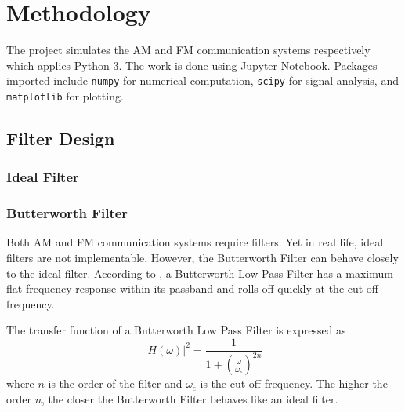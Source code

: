 \documentclass[../ECE459FinalProjectReport.tex]{subfiles}
\begin{document}
\chapter{Methodology}
The project simulates the AM and FM communication systems respectively which applies Python 3. The work is done using Jupyter Notebook. Packages imported include \verb|numpy| for numerical computation, \verb|scipy| for signal analysis, and \verb|matplotlib| for plotting.

\section{Filter Design}

\subsection{Ideal Filter}

\subsection{Butterworth Filter}

Both AM and FM communication systems require filters. Yet in real life, ideal filters are not implementable. However, the Butterworth Filter can behave closely to the ideal filter. According to \cite{storrButterworthFilterDesign2013,kudekiAnalogSignalsSystems2009}, a Butterworth Low Pass Filter has a maximum flat frequency response within its passband and rolls off quickly at the cut-off frequency.

The transfer function of a Butterworth Low Pass Filter is expressed as
\begin{equation}
    \left| H\left( \omega \right) \right|^2=\frac{1}{1+\left( \frac{\omega}{\omega _c} \right) ^{2n}}
\end{equation}
where $n$ is the order of the filter and $\omega_c$ is the cut-off frequency. The higher the order $n$, the closer the Butterworth Filter behaves like an ideal filter.
\end{document}
